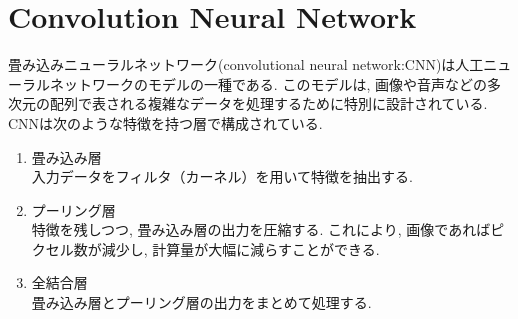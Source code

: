 
\section{Convolution Neural Network}
畳み込みニューラルネットワーク(convolutional neural network:CNN)は人工ニューラルネットワークのモデルの一種である. このモデルは, 画像や音声などの多次元の配列で表される複雑なデータを処理するために特別に設計されている. CNNは次のような特徴を持つ層で構成されている.
\begin{enumerate}
  \item 畳み込み層\\入力データをフィルタ（カーネル）を用いて特徴を抽出する.
  \item プーリング層\\特徴を残しつつ, 畳み込み層の出力を圧縮する. これにより, 画像であればピクセル数が減少し, 計算量が大幅に減らすことができる.
  \item 全結合層\\畳み込み層とプーリング層の出力をまとめて処理する.
\end{enumerate}


